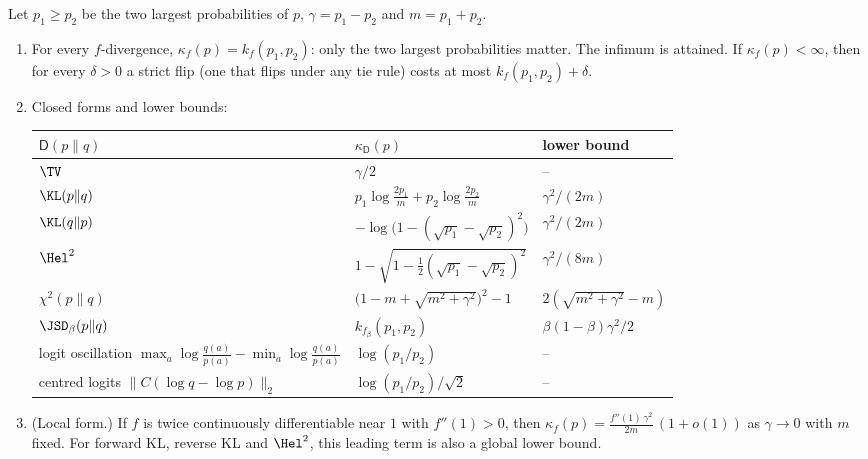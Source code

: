 \begin{proposition}\label{prop:flip}
\Pv\Ck Let $p_1\ge p_2$ be the two largest probabilities of $p$, $\gamma=p_1-p_2$ and $m=p_1+p_2$.
\begin{enumerate}[label=(\roman*),nosep]
\item For every $f$-divergence, $\kappa_f(p)=k_f(p_1,p_2)$: only the two largest probabilities matter. The
infimum is attained. If $\kappa_f(p)<\infty$, then for every $\delta>0$ a strict flip (one that flips under any
tie rule) costs at most $k_f(p_1,p_2)+\delta$.
\item Closed forms and lower bounds:
\begin{center}\small
\begin{tabular}{@{}lll@{}}
\toprule
$\mathsf D(p\|q)$ & $\kappa_{\mathsf D}(p)$ & lower bound\\\midrule
$\TV$ & $\gamma/2$ & --\\
$\KL(p\|q)$ & $p_1\log\frac{2p_1}{m}+p_2\log\frac{2p_2}{m}$ & $\gamma^2/(2m)$\\
$\KL(q\|p)$ & $-\log\big(1-(\sqrt{p_1}-\sqrt{p_2})^2\big)$ & $\gamma^2/(2m)$\\
$\Hel^2$ & $1-\sqrt{1-\frac12(\sqrt{p_1}-\sqrt{p_2})^2}$ & $\gamma^2/(8m)$\\
$\chi^2(p\|q)$ & $\big(1-m+\sqrt{m^2+\gamma^2}\big)^2-1$ & $2(\sqrt{m^2+\gamma^2}-m)$\\
$\JSD_\beta(p\|q)$ & $k_{f_\beta}(p_1,p_2)$ & $\beta(1-\beta)\gamma^2/2$\\
logit oscillation $\max_a\log\frac{q(a)}{p(a)}-\min_a\log\frac{q(a)}{p(a)}$ & $\log(p_1/p_2)$ & --\\
centred logits $\big\|C(\log q-\log p)\big\|_2$ & $\log(p_1/p_2)/\sqrt2$ & --\\\bottomrule
\end{tabular}
\end{center}
\item (Local form.) If $f$ is twice continuously differentiable near $1$ with $f''(1)>0$, then
$\kappa_f(p)=\frac{f''(1)\,\gamma^2}{2m}\,(1+o(1))$ as $\gamma\to0$ with $m$ fixed. For forward KL, reverse KL and
$\Hel^2$, this leading term is also a global lower bound.
\end{enumerate}
\end{proposition}
